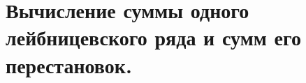 \documentclass[../main.tex]{subfiles}
\begin{document}
\newpage
\section{Вычисление суммы одного лейбницевского ряда и сумм его перестановок.}
\end{document}
